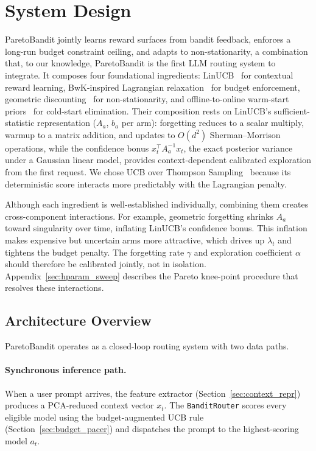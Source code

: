 \section{System Design}
\label{sec:system_design}

ParetoBandit jointly learns reward surfaces from bandit feedback, enforces a long-run budget constraint ceiling, and adapts to non-stationarity, a combination that, to our knowledge, ParetoBandit is the first LLM routing system to integrate. It composes four foundational ingredients: LinUCB~\cite{li2010contextual} for contextual reward learning, BwK-inspired Lagrangian relaxation~\cite{badanidiyuru2013bwk, agrawal2016linear} for budget enforcement, geometric discounting~\cite{garivier2011switching, russac2019weighted} for non-stationarity, and offline-to-online warm-start priors~\cite{oetomo2023warmstart} for cold-start elimination. Their composition rests on LinUCB's sufficient-statistic representation ($A_a$, $b_a$ per arm): forgetting reduces to a scalar multiply, warmup to a matrix addition, and updates to $O(d^2)$ Sherman--Morrison operations, while the confidence bonus $x_t^\top A_a^{-1} x_t$, the exact posterior variance under a Gaussian linear model, provides context-dependent calibrated exploration from the first request. We chose UCB over Thompson Sampling~\cite{agrawal2013thompson} because its deterministic score interacts more predictably with the Lagrangian penalty.

Although each ingredient is well-established individually, combining them creates cross-component interactions. For example, geometric forgetting shrinks $A_a$ toward singularity over time, inflating LinUCB's confidence bonus. This inflation makes expensive but uncertain arms more attractive, which drives up $\lambda_t$ and tightens the budget penalty. The forgetting rate $\gamma$ and exploration coefficient $\alpha$ should therefore be calibrated jointly, not in isolation. Appendix~\ref{sec:hparam_sweep} describes the Pareto knee-point procedure that resolves these interactions.

\subsection{Architecture Overview}
\label{sec:architecture}

ParetoBandit operates as a closed-loop routing system with two data paths.

\paragraph{Synchronous inference path.}
When a user prompt arrives, the feature extractor (Section~\ref{sec:context_repr}) produces a PCA-reduced context vector $x_t$. The \texttt{BanditRouter} scores every eligible model using the budget-augmented UCB rule (Section~\ref{sec:budget_pacer}) and dispatches the prompt to the highest-scoring model $a_t$.

